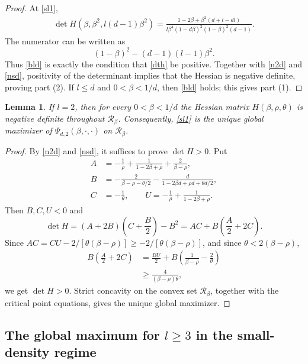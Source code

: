 \documentclass[11pt]{amsart}
\theoremstyle{plain}
\newtheorem{lemma}[theorem]{Lemma}
\numberwithin{equation}{section}
\numberwithin{theorem}{section}
\numberwithin{figure}{section}
\begin{document}
\begin{proof}
At \eqref{sl1},
\begin{align}
\det H(\beta,\beta^2,l(d-1)\beta^2)
=\frac{1-2\beta+\beta^2(d+l-dl)}
{l\beta^4(1-d\beta)^2(1-\beta)^2(d-1)}.
\label{dth}
\end{align}
The numerator can be written as
\[
(1-\beta)^2-(d-1)(l-1)\beta^2.
\]
Thus \eqref{bld} is exactly the condition that \eqref{dth} be positive.  Together with
\eqref{n2d} and \eqref{nsd}, positivity of the determinant implies that the Hessian is
negative definite, proving part (2).  If $l\leq d$ and $0<\beta<1/d$, then
\eqref{bld} holds; this gives part (1).
\end{proof}

\begin{lemma}\label{l04}
If $l=2$, then for every $0<\beta<1/d$ the Hessian matrix
$H(\beta,\rho,\theta)$ is negative definite throughout $\mathcal R_\beta$.
Consequently, \eqref{sl1} is the unique global maximizer of
$\Psi_{d,2}(\beta,\cdot,\cdot)$ on $\mathcal R_\beta$.
\end{lemma}

\begin{proof}
By \eqref{n2d} and \eqref{nsd}, it suffices to prove $\det H>0$.  Put
\begin{align*}
A&=-\frac1\rho+\frac1{1-2\beta+\rho}+\frac2{\beta-\rho},\\
B&=-\frac2{\beta-\rho-\theta/2}-\frac d{1-2\beta d+\rho d+\theta d/2},\\
C&=-\frac1\theta,
\qquad
U=-\frac1\rho+\frac1{1-2\beta+\rho}.
\end{align*}
Then $B,C,U<0$ and
\[
\det H=(A+2B)\left(C+\frac B2\right)-B^2
=AC+B\left(\frac A2+2C\right).
\]
Since $AC=CU-2/[\theta(\beta-\rho)]\geq -2/[\theta(\beta-\rho)]$, and since
$\theta<2(\beta-\rho)$,
\begin{align*}
B\left(\frac A2+2C\right)
&=\frac{BU}{2}+B\left(\frac1{\beta-\rho}-\frac2\theta\right)\\
&\geq \frac4{(\beta-\rho)\theta},
\end{align*}
we get $\det H>0$.  Strict concavity on the convex set $\mathcal R_\beta$, together
with the critical point equations, gives the unique global maximizer.
\end{proof}

\subsection*{\texorpdfstring{The global maximum for $l\geq3$ in the small-density regime}{The global maximum for l >= 3 in the small-density regime}}
\end{document}
